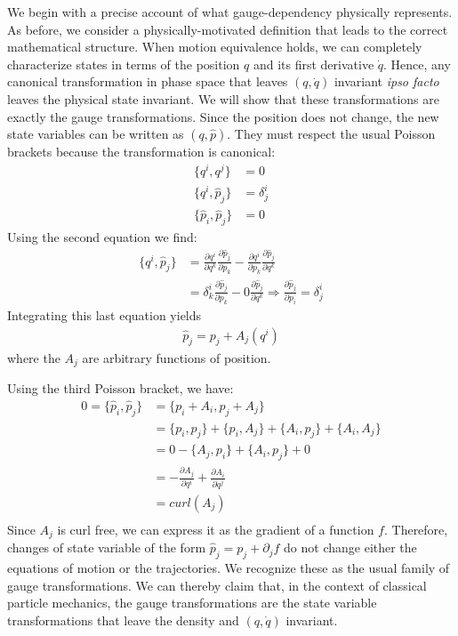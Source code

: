 \documentclass[12pt, english, twoside]{article} %
\begin{document}
We begin with a precise account of what gauge-dependency physically represents. As before, we consider a physically-motivated definition that leads to the correct mathematical structure. When motion equivalence holds, we can completely characterize states in terms of the position $q$ and its first derivative $\dot{q}$. Hence, any canonical transformation in phase space that leaves $(q,\dot{q}) $ invariant \textit{ipso facto} leaves the physical state invariant. We will show that these transformations are exactly the gauge transformations. Since the position does not change, the new state variables can be written as $(q, \hat{p})$. They must respect the usual Poisson brackets because the transformation is canonical:
\begin{equation}
\begin{aligned}
	\{q^i, q^j\} &= 0 \\
	\{q^i, \hat{p}_j\} &= \delta^i_j \\
	\{\hat{p}_i, \hat{p}_j\} &= 0
\end{aligned}
\end{equation}
Using the second equation we find:
\begin{equation}
\begin{aligned}
	\{q^i, \hat{p}_j\} &= \frac{\partial q^i}{\partial q^k} \frac{\partial \hat{p}_j}{\partial p_k} - \frac{\partial q^i}{\partial p_k} \frac{\partial \hat{p}_j}{\partial q^k} \\
	&= \delta^i_k \frac{\partial \hat{p}_j}{\partial p_k} - 0 \frac{\partial \hat{p}_j}{\partial q^k} \Rightarrow \frac{\partial \hat{p}_j}{\partial p_i} = \delta^i_j
\end{aligned}
\end{equation}
Integrating this last equation yields
\begin{equation}
\begin{aligned}
\hat{p}_j = p_j + A_j(q^i)
\end{aligned}
\end{equation}
where the $A_j$ are arbitrary functions of position. 

Using the third Poisson bracket, we have:
\begin{equation}
\begin{aligned}
0 = \{\hat{p}_i, \hat{p}_j\} &= \{p_i + A_i, p_j + A_j\} \\
&= \{p_i, p_j \} + \{p_i , A_j\} + \{A_i, p_j \} + \{A_i, A_j\} \\
&= 0 - \{A_j, p_i\} + \{A_i, p_j \} + 0 \\
&= - \frac{\partial A_j}{\partial q^i} + \frac{\partial A_i}{\partial q^j} \\
&= curl(A_j) \\
\end{aligned}
\end{equation}
Since $A_j$ is curl free, we can express it as the gradient of a function $f$. Therefore, changes of state variable of the form $\hat{p}_j = p_j + \partial_j f$ do not change either the equations of motion or the trajectories. We recognize these as the usual family of gauge transformations. We can thereby claim that, in the context of classical particle mechanics, the gauge transformations are the state variable transformations that leave the density and $(q,\dot{q}) $ invariant.
\end{document}
